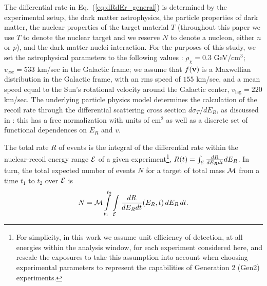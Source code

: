 \documentclass[11pt]{article}
\newcommand{\beq}{\begin{equation}} \newcommand{\eeq}{\end{equation}}
\newcommand{\Eq}[1]{Eq.~(\ref{#1})} \newcommand{\Eqs}[2]{Eqs.~(\ref{#1}) and (\ref{#2})} \newcommand{\Eqm}[2]{Eqs.~(\ref{#1}) through (\ref{#2})}
\begin{document}
The differential rate in \Eq{eq:dRdEr_general} is determined by the experimental setup, the dark matter astrophysics, the particle properties of dark matter, the nuclear properties of the target material $T$ (throughout this paper we use $T$ to denote the nuclear target and we reserve $N$ to denote a nucleon, either $n$ or $p$), and the dark matter-nuclei interaction. For the purposes of this study, we set the astrophysical parameters to the following values \cite{Bovy:2013raa,Piffl:2013mla}: $\rho_\chi=0.3$ GeV/cm$^3$; $v_{\mathrm{esc}} = 533$ km/sec in the Galactic frame; we assume that $f(\mathrm{\mbox{\bf{v}}})$ is a Maxwellian distribution in the Galactic frame, with an rms speed of $155$ km/sec, and a mean speed equal to the Sun's rotational velocity around the Galactic center, $v_\textrm{lag}=220$ km/sec. The underlying particle physics model determines the calculation of the recoil rate through the differential scattering cross section ${d\sigma_T}/{dE_R}$, as discussed in \cite{Gluscevic:2015sqa,Gresham:2014vja}: this has a free normalization with units of cm${}^2$ as well as a discrete set of functional dependences on $E_R$ and $v$.


The total rate $R$ of events is the integral of the differential rate within the nuclear-recoil energy range ${\cal E}$ of a given experiment\footnote{For simplicity, in this work we assume unit efficiency of detection, at all energies within the analysis window, for each experiment considered here, and rescale the exposures to take this assumption into account when choosing experimental parameters to represent the capabilities of Generation 2 (Gen2) experiments.}, $R(t)=\int_{\cal E} \frac{dR}{dE_R dt} dE_R$. In turn, the total expected number of events $N$ for a target of total mass ${\cal M}$ from a time $t_1$ to $t_2$ over ${\cal E}$ is
\beq
N =  \cM \int\limits_{t_1}^{t_2} \int\limits_\cE  \frac{dR}{dE_R dt}(E_R,t)\,dE_R \,dt.
\eeq

\end{document}
